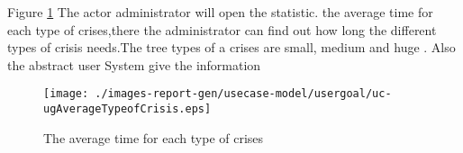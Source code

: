 \begin{usecase}

\end{usecase} 


Figure \ref{fig:lu.uni.lassy.excalibur.examples.icrash-RE-UCD-uc-ugAverageTypeofCrisis}
The actor administrator will open the statistic. the average time for each type of crises,there the administrator can find out how long the different types of crisis needs.The tree types of a crises are small, medium and huge . Also the abstract user System give the information  

\begin{figure}[htbp]
\begin{center}

\texttt{[image: ./images-report-gen/usecase-model/usergoal/uc-ugAverageTypeofCrisis.eps]}
\end{center}
\caption[lu.uni.lassy.excalibur.examples.icrash Use Case Diagram: uc-ugAverageTypeofCrisis]{The average time for each type of crises}
\label{fig:lu.uni.lassy.excalibur.examples.icrash-RE-UCD-uc-ugAverageTypeofCrisis}
\end{figure}
\vspace{0.5cm}
